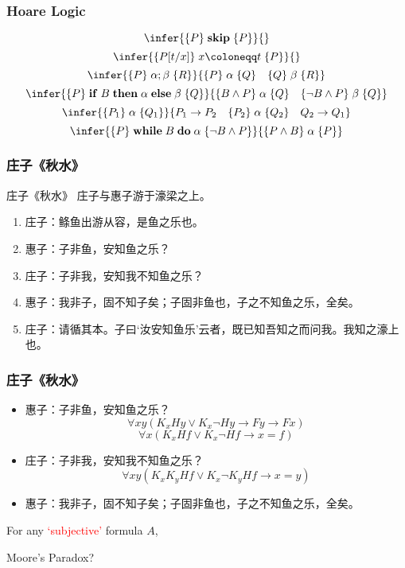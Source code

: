 \documentclass[UTF8,11pt,colorlinks,compress,openany]{beamer}%
\begin{document}
\begin{frame}\frametitle{Hoare Logic}
\[\infer{\{P\} \;\mathbf{skip}\; \{P\}}{}\]
\[\infer{\{P[t/x]\}\; x\coloneqq t\; \{P\}}{}\]
\[\infer{\{P\}\; \alpha;\beta\; \{R\}}{\{P\}\;\alpha\;\{Q\}\quad\{Q\}\;\beta\;\{R\}}\]
\[\infer{\{P\} \;\mathbf{if}\; B \;\mathbf{then}\; \alpha \;\mathbf{else}\; \beta\; \{Q\}}{\{B\wedge P\}\;\alpha\;\{Q\}\quad\{\neg B\wedge P\}\;\beta\;\{Q\}}\]
\[\infer{\{P_1\}\;\alpha\;\{Q_1\}}{P_1\to P_2\quad \{P_2\}\;\alpha\;\{Q_2\}\quad Q_2\to Q_1}\]
\[\infer{\{P\} \;\mathbf{while}\; B \;\mathbf{do}\; \alpha\; \{\neg B\wedge P\}}{\{P\wedge B\}\; \alpha\; \{P\}}\]
\end{frame}

\begin{frame}\frametitle{庄子《秋水》}
\begin{block}{庄子《秋水》}
庄子与惠子游于濠梁之上。
\begin{enumerate}
		\item 庄子：鲦鱼出游从容，是鱼之乐也。
		\item 惠子：子非鱼，安知鱼之乐？
		\item 庄子：子非我，安知我不知鱼之乐？
		\item 惠子：我非子，固不知子矣；子固非鱼也，子之不知鱼之乐，全矣。
		\item 庄子：请循其本。子曰‘汝安知鱼乐’云者，既已知吾知之而问我。我知之濠上也。
\end{enumerate}
\end{block}
\end{frame}

\begin{frame}\frametitle{庄子《秋水》}
\begin{itemize}
\item 惠子：子非鱼，安知鱼之乐？
\[\forall xy(K_xHy\vee K_x\neg Hy\to Fy\to Fx)\]
\[\forall x(K_xHf\vee K_x\neg Hf\to x=f)\]
\item 庄子：子非我，安知我不知鱼之乐？
\[\forall xy(K_x K_yHf\vee K_x\neg K_y Hf\to x=y)\]
\item 惠子：我非子，固不知子矣；子固非鱼也，子之不知鱼之乐，全矣。
\end{itemize}
\begin{block}{}
For any \textcolor{red}{`subjective'} formula $A$,\\
\centerline{\hfill Moore's Paradox?}
\end{block}
\end{frame}
\end{document}
